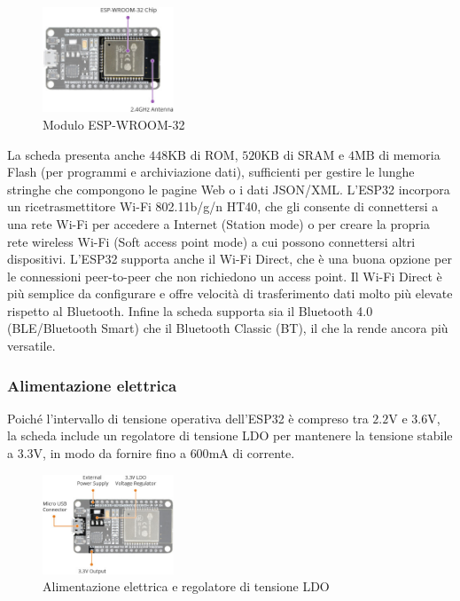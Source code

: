 \documentclass[a4paper,12pt]{report}  %
\begin{document}
\begin{figure}[h]
    \centering
    \includegraphics[width=0.35\textwidth]{imgs/ESP32-Hardware-Specifications-ESP-WROOM-32-Chip.jpg}
    \caption{Modulo ESP-WROOM-32}
    \label{fig:ESP-WROOM-32}
\end{figure}

La scheda presenta anche $448 \text{KB}$ di ROM, $520 \text{KB}$ di SRAM e $4 \text{MB}$ di memoria Flash (per programmi e archiviazione dati), sufficienti per gestire le lunghe stringhe che compongono le pagine Web o i dati JSON/XML.
L'ESP32 incorpora un ricetrasmettitore Wi-Fi 802.11b/g/n HT40, che gli consente di connettersi a una rete Wi-Fi per accedere a Internet (Station mode) o per creare la propria rete wireless Wi-Fi (Soft access point mode) a cui possono connettersi altri dispositivi.
L'ESP32 supporta anche il Wi-Fi Direct, che è una buona opzione per le connessioni peer-to-peer che non richiedono un access point.
Il Wi-Fi Direct è più semplice da conﬁgurare e oﬀre velocità di trasferimento dati molto più elevate rispetto al Bluetooth.
Inﬁne la scheda supporta sia il Bluetooth 4.0 (BLE/Bluetooth Smart) che il Bluetooth Classic (BT), il che la rende ancora più versatile.

\subsubsection{Alimentazione elettrica}
Poiché l'intervallo di tensione operativa dell'ESP32 è compreso tra $2.2 \text{V}$ e $3.6 \text{V}$, la scheda include un regolatore di tensione LDO per mantenere la tensione stabile a $3.3 \text{V}$, in modo da fornire fino a $600 \text{mA}$ di corrente.

\begin{figure}[h]
    \centering
    \includegraphics[width=0.35\textwidth]{imgs/ESP32-Hardware-Specifications-Power-Supply.jpg}
    \caption{Alimentazione elettrica e regolatore di tensione LDO}
    \label{fig:ESP32-LDO}
\end{figure}
\end{document}
